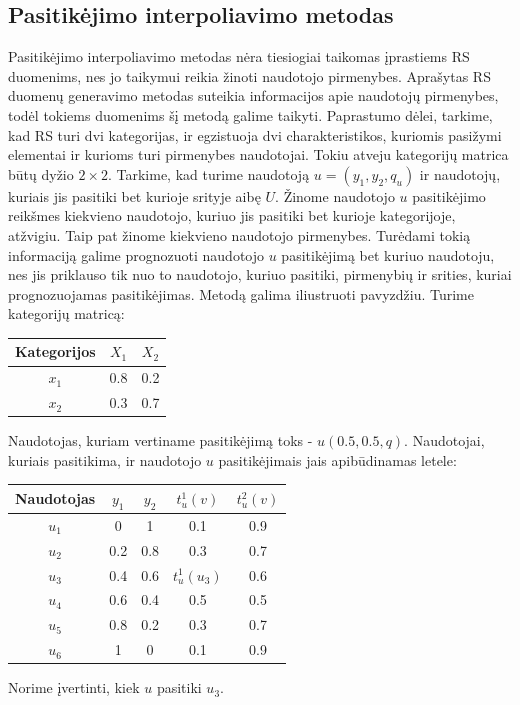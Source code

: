 \documentclass{VUMIFInfMagistrinis}
\begin{document}

\subsection{Pasitikėjimo interpoliavimo metodas}
\indent
Pasitikėjimo interpoliavimo metodas nėra tiesiogiai taikomas įprastiems RS duomenims, nes jo taikymui reikia žinoti naudotojo pirmenybes. Aprašytas RS duomenų generavimo metodas suteikia informacijos apie naudotojų pirmenybes, todėl tokiems duomenims šį metodą galime taikyti.
\newline
\indent
Paprastumo dėlei, tarkime, kad RS turi dvi kategorijas, ir egzistuoja dvi charakteristikos, kuriomis pasižymi elementai ir kurioms turi pirmenybes naudotojai. Tokiu atveju kategorijų matrica būtų dyžio $2 \times 2$.
Tarkime, kad turime naudotoją $u = (y_1, y_2, q_u)$ ir naudotojų, kuriais jis pasitiki bet kurioje srityje aibę $U$. Žinome naudotojo $u$ pasitikėjimo reikšmes kiekvieno naudotojo, kuriuo jis pasitiki bet kurioje kategorijoje, atžvigiu. Taip pat žinome kiekvieno naudotojo pirmenybes. Turėdami tokią informaciją galime prognozuoti naudotojo $u$ pasitikėjimą bet kuriuo naudotoju, nes jis priklauso tik nuo to naudotojo, kuriuo pasitiki, pirmenybių ir srities, kuriai prognozuojamas pasitikėjimas.
\newline
\indent
Metodą galima iliustruoti pavyzdžiu. Turime kategorijų matricą:
\begin{center}
	\begin{tabular}{||c c c ||} 
		\hline
		Kategorijos & $X_1$ & $X_2$ \\ [0.5ex] 
		\hline
		\hline
		$x_1$ & 0.8 & 0.2 \\
		\hline
		$x_2$ & 0.3 & 0.7 \\ [1ex] 
		\hline
	\end{tabular}
\end{center}
Naudotojas, kuriam vertiname pasitikėjimą toks - $u(0.5, 0.5, q)$. Naudotojai, kuriais pasitikima, ir naudotojo $u$ pasitikėjimais jais apibūdinamas letele:
\begin{center}
	\begin{tabular}{||c c c c c ||} 
		\hline
		Naudotojas & $y_1$ & $y_2$ & $t_u^1(v)$ & $t_u^2(v)$ \\ [0.5ex] 
		\hline
		\hline
		$u_1$ & 0 & 1 & 0.1 & 0.9 \\
		\hline
		$u_2$ & 0.2 & 0.8 & 0.3 & 0.7  \\
		\hline
		$u_3$ & 0.4 & 0.6 & $t_u^1(u_3)$ & 0.6  \\
		\hline
		$u_4$ & 0.6 & 0.4 & 0.5 & 0.5  \\
		\hline
		$u_5$ & 0.8 & 0.2 & 0.3 & 0.7  \\
		\hline
		$u_6$ & 1 & 0 & 0.1 & 0.9  \\ [1ex] 
		\hline
	\end{tabular}
\end{center}
Norime įvertinti, kiek $u$ pasitiki $u_3$.
\end{document}
